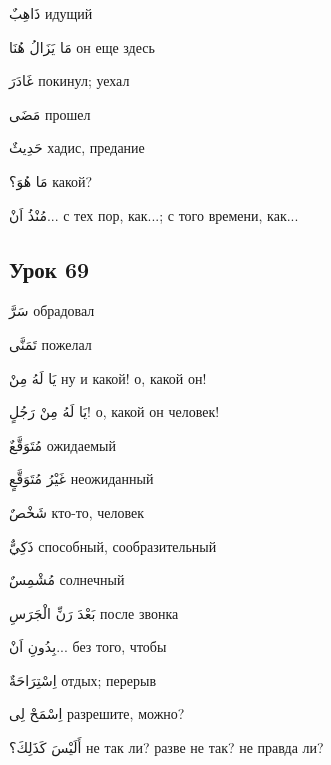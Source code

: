 \documentclass[a5paper]{article}
\newcommand\textstyleDropCaps[1]{#1}
\newcommand\textstyleCaptioncharacters[1]{#1}
\begin{document}
\textstyleCaptioncharacters{ذَاهِبٌ }\textstyleDropCaps{идущий‎}

\textstyleCaptioncharacters{مَا يَزَالُ هُنَا }\textstyleDropCaps{он еще здесь‎}

\textstyleCaptioncharacters{غَادَرَ }\textstyleDropCaps{покинул; уехал‎}

\textstyleCaptioncharacters{مَضَى }\textstyleDropCaps{прошел‎}

\textstyleCaptioncharacters{حَدِيثٌ }\textstyleDropCaps{хадис, предание‎}

\textstyleCaptioncharacters{مَا هُوَ؟ }\textstyleDropCaps{какой?‎}

\textstyleCaptioncharacters{مُنْذُ اَنْ... }\textstyleDropCaps{с тех пор, как...; с того времени, как...‎}

\subsection[Урок 69‎]{\textstyleDropCaps{Урок 69‎}}
\textstyleCaptioncharacters{سَرَّ }\textstyleDropCaps{обрадовал‎}

\textstyleCaptioncharacters{تَمَنَّى }\textstyleDropCaps{пожелал‎}

\textstyleCaptioncharacters{يَا لَهُ مِنْ }\textstyleDropCaps{ну и какой! о, какой он!‎}

\textstyleCaptioncharacters{يَا لَهُ مِنْ رَجُلٍ!ِ }\textstyleDropCaps{о, ка­кой он человек!‎}

\textstyleCaptioncharacters{مُتَوَقَّعٌ }\textstyleDropCaps{ожидаемый‎}

\textstyleCaptioncharacters{غَيْرُ مُتَوَقَّعٍ }\textstyleDropCaps{неожидан­ный‎}

\textstyleCaptioncharacters{شَخْصٌ }\textstyleDropCaps{кто-то, человек‎}

\textstyleCaptioncharacters{ذَكِيٌّ }\textstyleDropCaps{способный, сообра­зительный‎}

\textstyleCaptioncharacters{مُشْمِسٌ }\textstyleDropCaps{солнечный‎}

\textstyleCaptioncharacters{بَعْدَ رَنِّ الْجَرَسِ }\textstyleDropCaps{после звонка‎}

\textstyleCaptioncharacters{بِدُونِ اَنْ...ِ }\textstyleDropCaps{без того, что­бы‎}

\textstyleCaptioncharacters{اِسْتِرَاحَةٌ }\textstyleDropCaps{отдых; перерыв‎}

\textstyleCaptioncharacters{اِسْمَحْ لِى }\textstyleDropCaps{разрешите, можно?‎}

\textstyleCaptioncharacters{أَلَيْسَ كَذَلِكَ؟ }\textstyleDropCaps{не так ли? разве не так? не правда ли?‎}
\end{document}
